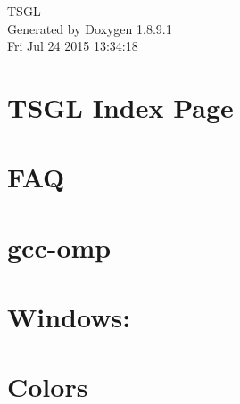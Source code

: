 \documentclass[twoside]{book}
\newcommand{\+}{\discretionary{\mbox{\scriptsize$\hookleftarrow$}}{}{}}
\newcommand{\clearemptydoublepage}{%
  \newpage{\pagestyle{empty}\cleardoublepage}%
}
\begin{document}
\hypersetup{pageanchor=false,
             bookmarks=true,
             bookmarksnumbered=true,
             pdfencoding=unicode
            }
\begin{titlepage}
\vspace*{7cm}
\begin{center}%
{\Large T\+S\+G\+L }\\
\vspace*{1cm}
{\large Generated by Doxygen 1.8.9.1}\\
\vspace*{0.5cm}
{\small Fri Jul 24 2015 13:34:18}\\
\end{center}
\end{titlepage}
\clearemptydoublepage
\tableofcontents
\clearemptydoublepage
{}
\hypersetup{pageanchor=true}

\chapter{T\+S\+G\+L Index Page}
\label{index}\hypertarget{index}{}
\chapter{F\+A\+Q}
\label{md__home_pretzel_workspace_tsgl__t_s_g_l_docs-src_faq}
\hypertarget{md__home_pretzel_workspace_tsgl__t_s_g_l_docs-src_faq}{}

\chapter{gcc-\/omp}
\label{md__home_pretzel_workspace_tsgl__t_s_g_l_docs-src_gcc-omp}
\hypertarget{md__home_pretzel_workspace_tsgl__t_s_g_l_docs-src_gcc-omp}{}

\chapter{Windows\+:}
\label{md__home_pretzel_workspace_tsgl__t_s_g_l_docs-src_library-versions}
\hypertarget{md__home_pretzel_workspace_tsgl__t_s_g_l_docs-src_library-versions}{}

\chapter{Colors}
\label{md__home_pretzel_workspace_tsgl__t_s_g_l_docs-src_tutorials_colors}
\hypertarget{md__home_pretzel_workspace_tsgl__t_s_g_l_docs-src_tutorials_colors}{}

\end{document}
